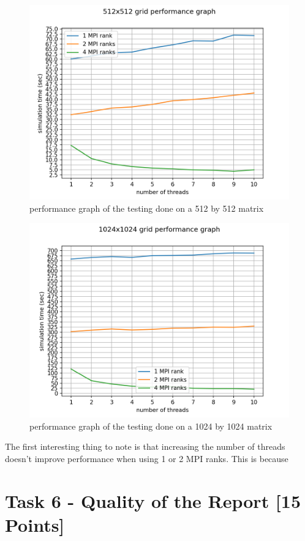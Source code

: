 \documentclass[unicode,11pt,a4paper,oneside,numbers=endperiod,openany]{scrartcl}
\begin{document}
\begin{figure}[H]
\centering
\includegraphics[width=0.9\linewidth]{512x512_plot.png}
\caption{performance graph of the testing done on a 512 by 512 matrix}
\end{figure}

\begin{figure}[H]
\centering
\includegraphics[width=0.9\linewidth]{1024x1024_plot.png}
\caption{performance graph of the testing done on a 1024 by 1024 matrix}
\end{figure}
The first interesting thing to note is that increasing the number of threads doesn't improve performance when using 1 or 2 MPI ranks. This is because 

\section{Task 6 - Quality of the Report [15 Points]}
\end{document}
